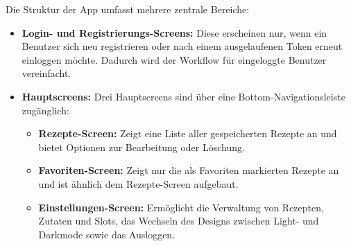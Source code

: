Die Struktur der App umfasst mehrere zentrale Bereiche:

\begin{itemize}
    \item \textbf{Login- und Registrierungs-Screens:} Diese erscheinen nur, wenn ein Benutzer sich neu registrieren oder nach einem ausgelaufenen Token erneut einloggen möchte. Dadurch wird der Workflow für eingeloggte Benutzer vereinfacht.
    \item \textbf{Hauptscreens:} Drei Hauptscreens sind über eine Bottom-Navigationsleiste zugänglich:
    \begin{itemize}
        \item \textbf{Rezepte-Screen:} Zeigt eine Liste aller gespeicherten Rezepte an und bietet Optionen zur Bearbeitung oder Löschung.
        \item \textbf{Favoriten-Screen:} Zeigt nur die als Favoriten markierten Rezepte an und ist ähnlich dem Rezepte-Screen aufgebaut.
        \item \textbf{Einstellungen-Screen:} Ermöglicht die Verwaltung von Rezepten, Zutaten und Slots, das Wechseln des Designs zwischen Light- und Darkmode sowie das Ausloggen.
    \end{itemize}
\end{itemize}



